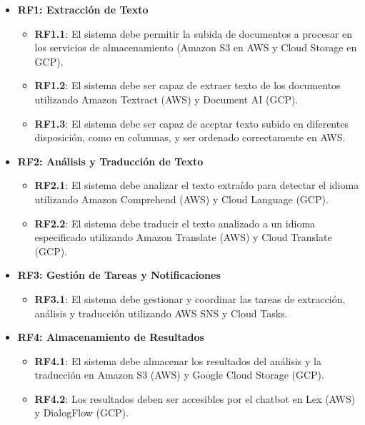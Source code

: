 \begin{itemize}
\item \textbf{RF1: Extracción de Texto}
    \begin{itemize}
        \item \textbf{RF1.1}: El sistema debe permitir la subida de documentos a procesar en los servicios de almacenamiento (Amazon S3 en AWS y Cloud Storage en GCP).
        \item \textbf{RF1.2}: El sistema debe ser capaz de extraer texto de los documentos utilizando Amazon Textract (AWS) y Document AI (GCP).
        \item \textbf{RF1.3}: El sistema debe ser capaz de aceptar texto subido en diferentes disposición, como en columnas, y ser ordenado correctamente en AWS.
    \end{itemize}
    
    \item \textbf{RF2: Análisis y Traducción de Texto}
    \begin{itemize}
        \item \textbf{RF2.1}: El sistema debe analizar el texto extraído para detectar el idioma utilizando Amazon Comprehend (AWS) y Cloud Language (GCP).
        \item \textbf{RF2.2}: El sistema debe traducir el texto analizado a un idioma especificado utilizando Amazon Translate (AWS) y Cloud Translate (GCP).
    \end{itemize}

    \item \textbf{RF3: Gestión de Tareas y Notificaciones}
    \begin{itemize}
        \item \textbf{RF3.1}: El sistema debe gestionar y coordinar las tareas de extracción, análisis y traducción utilizando AWS SNS y Cloud Tasks.
    \end{itemize}
       
    \item \textbf{RF4: Almacenamiento de Resultados}
    \begin{itemize}
        \item \textbf{RF4.1}: El sistema debe almacenar los resultados del análisis y la traducción en Amazon S3 (AWS) y Google Cloud Storage (GCP).
        \item \textbf{RF4.2}: Los resultados deben ser accesibles por el chatbot en Lex (AWS) y DialogFlow (GCP).
    \end{itemize}
    

\end{itemize}
